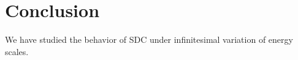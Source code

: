 \chapter{Conclusion}
\label{Conclusion}

We have studied the behavior of SDC under infinitesimal variation of energy scales. 